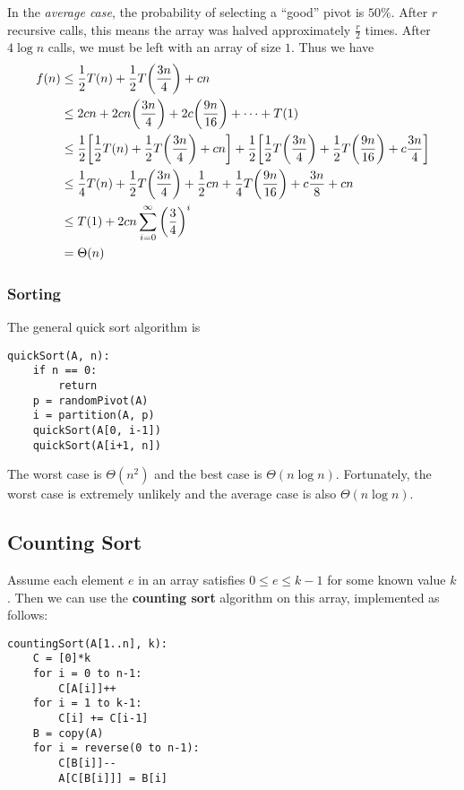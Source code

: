 \documentclass[12pt]{article}
\begin{document}
In the \emph{average case}, the probability of selecting a ``good'' pivot is $50\%$. After $r$ recursive calls, this means the array was halved approximately $\frac{r}{2}$ times. After $4\log n$ calls, we must be left with an array of size $1$. Thus we have
\begin{align*}
f(n) &\leq \frac{1}{2} T(n) + \frac{1}{2} T\bigg(\frac{3n}{4}\bigg) + cn\\
&\leq 2cn + 2cn\bigg(\frac{3n}{4}\bigg) + 2c\bigg(\frac{9n}{16}\bigg) + \cdots + T(1)\\
&\leq \frac{1}{2} \bigg[\frac{1}{2} T(n) + \frac{1}{2} T\bigg(\frac{3n}{4}\bigg) + cn\bigg] + \frac{1}{2} \bigg[\frac{1}{2} T\bigg(\frac{3n}{4}\bigg) + \frac{1}{2} T\bigg(\frac{9n}{16}\bigg) + c \frac{3n}{4}\bigg]\\
&\leq \frac{1}{4} T(n) + \frac{1}{2} T\bigg(\frac{3n}{4}\bigg) + \frac{1}{2} cn + \frac{1}{4} T\bigg(\frac{9n}{16}\bigg) + c\frac{3n}{8}+ cn\\
&\leq T(1) + 2cn\displaystyle\sum_{i=0}^\infty {\bigg(\frac{3}{4}\bigg)}^i\\
&= \Theta(n)
\end{align*}

\subsubsection{Sorting}
The general quick sort algorithm is
\begin{verbatim}
quickSort(A, n):
    if n == 0:
        return
    p = randomPivot(A)
    i = partition(A, p)
    quickSort(A[0, i-1])
    quickSort(A[i+1, n])
\end{verbatim}

The worst case is $\Theta(n^2)$ and the best case is $\Theta(n\log n)$. Fortunately, the worst case is extremely unlikely and the average case is also $\Theta(n\log n)$.

\subsection{Counting Sort}
Assume each element $e$ in an array satisfies $0 \leq e \leq k-1$ for some known value $k$. Then we can use the {\bf counting sort} algorithm on this array, implemented as follows:
\begin{verbatim}
countingSort(A[1..n], k):
    C = [0]*k
    for i = 0 to n-1:
        C[A[i]]++
    for i = 1 to k-1:
        C[i] += C[i-1]
    B = copy(A)
    for i = reverse(0 to n-1):
        C[B[i]]--
        A[C[B[i]]] = B[i]
\end{verbatim}
\end{document}
